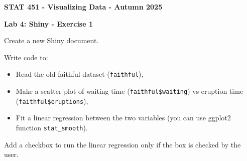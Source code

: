 \documentclass[letterpaper, 12pt]{article}
\begin{document}
\begin{center}
\textbf{\Large{STAT 451 - Visualizing Data - Autumn 2025}}
\end{center}

\vspace{2em}

\textbf{\large{Lab 4: Shiny - Exercise 1}}

\vspace{2em}

Create a new Shiny document.

\vspace{1em}

Write code to:
\begin{itemize}
	\item Read the old faithful dataset (\verb|faithful|),
	\item Make a scatter plot of waiting time (\verb|faithful$waiting|) vs eruption time (\verb|faithful$eruptions|),
	\item Fit a linear regression between the two variables (you can use ggplot2 function \verb|stat_smooth|).
\end{itemize}

\vspace{1em}

Add a checkbox to run the linear regression only if the box is checked by the user.
 
\end{document}
